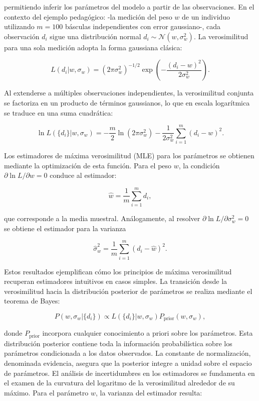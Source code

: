 permitiendo inferir los parámetros del modelo a partir de las observaciones. En el contexto del ejemplo pedagógico: -la medición del peso $w$ de un individuo utilizando $m=100$ básculas independientes con error gaussiano-, cada observación $d_i$ sigue una distribución normal $d_i \sim \mathcal{N}(w,\sigma_w^2)$. La verosimilitud para una sola medición adopta la forma gaussiana clásica:

\begin{equation}
L(d_i|w,\sigma_w) = (2\pi\sigma_w^2)^{-1/2} \exp\left(-\frac{(d_i - w)^2}{2\sigma_w^2}\right).
\end{equation}

Al extenderse a múltiples observaciones independientes, la verosimilitud conjunta se factoriza en un producto de términos gaussianos, lo que en escala logarítmica se traduce en una suma cuadrática: 

\begin{equation}
\ln L(\{d_i\}|w,\sigma_w) = -\frac{m}{2}\ln(2\pi\sigma_w^2) - \frac{1}{2\sigma_w^2}\sum_{i=1}^m (d_i - w)^2.
\end{equation}

Los estimadores de máxima verosimilitud (MLE) para los parámetros se obtienen mediante la optimización de esta función. Para el peso $w$, la condición $\partial \ln L/\partial w = 0$ conduce al estimador: 

\begin{equation}
\hat{w} = \frac{1}{m}\sum_{i=1}^m d_i,
\end{equation}

que corresponde a la media muestral. Análogamente, al resolver $\partial \ln L/\partial \sigma_w^2 = 0$ se obtiene el estimador para la varianza 

\begin{equation}
\hat{\sigma}_w^2 = \frac{1}{m}\sum_{i=1}^m (d_i - \hat{w})^2.
\end{equation} 

Estos resultados ejemplifican cómo los principios de máxima verosimilitud recuperan estimadores intuitivos en casos simples. La transición desde la verosimilitud hacia la distribución posterior de parámetros se realiza mediante el teorema de Bayes:

\begin{equation}
P(w,\sigma_w|\{d_i\}) \propto L(\{d_i\}|w,\sigma_w) P_{\text{prior}}(w,\sigma_w),
\end{equation}

donde $P_{\text{prior}}$ incorpora cualquier conocimiento a priori sobre los parámetros. Esta distribución posterior contiene toda la información probabilística sobre los parámetros condicionada a los datos observados. La constante de normalización, denominada evidencia, asegura que la posterior integre a unidad sobre el espacio de parámetros. El análisis de incertidumbres en los estimadores se fundamenta en el examen de la curvatura del logaritmo de la verosimilitud alrededor de su máximo. Para el parámetro $w$, la varianza del estimador resulta:

